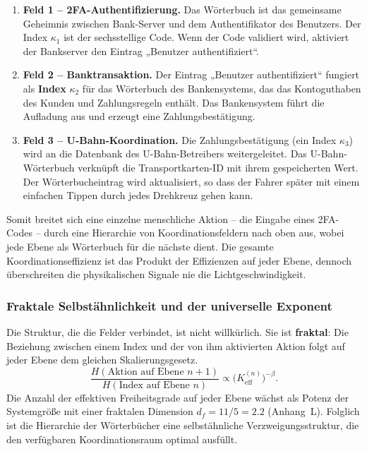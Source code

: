 \documentclass[12pt,a4paper]{article}
\theoremstyle{remark}
\begin{document}
	\begin{enumerate}[leftmargin=*]
		\item \textbf{Feld 1 – 2FA-Authentifizierung.}
		Das Wörterbuch ist das gemeinsame Geheimnis zwischen Bank-Server und dem Authentifikator des Benutzers. Der Index $\kappa_1$ ist der sechsstellige Code. Wenn der Code validiert wird, aktiviert der Bankserver den Eintrag „Benutzer authentifiziert“.
		
		\item \textbf{Feld 2 – Banktransaktion.}
		Der Eintrag „Benutzer authentifiziert“ fungiert als \textbf{Index} $\kappa_2$ für das Wörterbuch des Bankensystems, das das Kontoguthaben des Kunden und Zahlungsregeln enthält. Das Bankensystem führt die Aufladung aus und erzeugt eine Zahlungsbestätigung.
		
		\item \textbf{Feld 3 – U-Bahn-Koordination.}
		Die Zahlungsbestätigung (ein Index $\kappa_3$) wird an die Datenbank des U-Bahn-Betreibers weitergeleitet. Das U-Bahn-Wörterbuch verknüpft die Transportkarten-ID mit ihrem gespeicherten Wert. Der Wörterbucheintrag wird aktualisiert, so dass der Fahrer später mit einem einfachen Tippen durch jedes Drehkreuz gehen kann.
	\end{enumerate}
	
	Somit breitet sich eine einzelne menschliche Aktion – die Eingabe eines 2FA-Codes – durch eine Hierarchie von Koordinationsfeldern nach oben aus, wobei jede Ebene als Wörterbuch für die nächste dient. Die gesamte Koordinationseffizienz ist das Produkt der Effizienzen auf jeder Ebene, dennoch überschreiten die physikalischen Signale nie die Lichtgeschwindigkeit.
	
	\subsubsection{Fraktale Selbstähnlichkeit und der universelle Exponent}
	
	Die Struktur, die die Felder verbindet, ist nicht willkürlich. Sie ist \textbf{fraktal}: Die Beziehung zwischen einem Index und der von ihm aktivierten Aktion folgt auf jeder Ebene dem gleichen Skalierungsgesetz.
	\[
	\frac{H(\text{Aktion auf Ebene } n+1)}{H(\text{Index auf Ebene } n)}
	\propto \bigl(K_{\mathrm{eff}}^{(n)}\bigr)^{-\beta}.
	\]
	Die Anzahl der effektiven Freiheitsgrade auf jeder Ebene wächst als Potenz der Systemgröße mit einer fraktalen Dimension $d_f = 11/5 = 2.2$ (Anhang~L). Folglich ist die Hierarchie der Wörterbücher eine selbstähnliche Verzweigungsstruktur, die den verfügbaren Koordinationsraum optimal ausfüllt.
	
\end{document}
